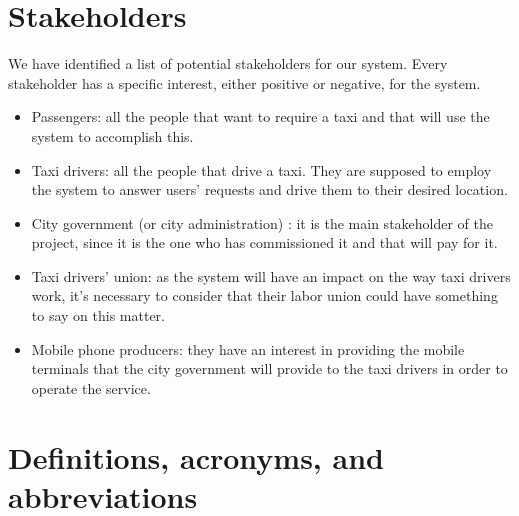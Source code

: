 \section{Stakeholders}
We have identified a list of potential stakeholders for our system. Every stakeholder has a specific interest, either positive or negative, for the system.
\begin{itemize}
\item Passengers: all the people that want to require a taxi and that will use the system to accomplish this.
\item Taxi drivers: all the people that drive a taxi. They are supposed to employ the system to answer users' requests and drive them to their desired location.
\item City government (or city administration) : it is the main stakeholder of the project, since it is the one who has commissioned it and that will pay for it.
\item Taxi drivers’ union: as the system will have an impact on the way taxi drivers work, it's necessary to consider that their labor union could have something to say on this matter. 
\item Mobile phone producers: they have an interest in providing the mobile terminals that the city government will provide to the taxi drivers in order to operate the service. 
\end{itemize}


\section{Definitions, acronyms, and abbreviations}
